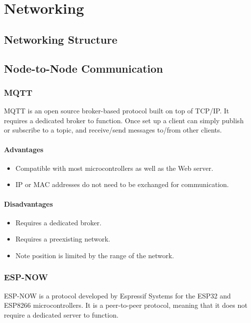 \chapter{Networking}
\section{Networking Structure}


\section{Node-to-Node Communication}
    \subsection{MQTT}
    MQTT is an open source broker-based protocol built on top of TCP/IP. It
    requires a dedicated broker to function. Once set up a client can simply 
    publish or subscribe to a topic, and receive/send messages to/from other 
    clients.
    
        \subsubsection{Advantages}
        \begin{itemize}
            \item Compatible with most microcontrollers as well as the Web server.
            \item IP or MAC addresses do not need to be exchanged for communication.
        \end{itemize}

        \subsubsection{Disadvantages}
        \begin{itemize}
            \item Requires a dedicated broker.
            \item Requires a preexisting network.
            \item Note position is limited by the range of the network.
        \end{itemize}

    \subsection{ESP-NOW}
    ESP-NOW is a protocol developed by Espressif Systems for the ESP32 and ESP8266
    microcontrollers. It is a peer-to-peer protocol, meaning that it does not require
    a dedicated server to function.

